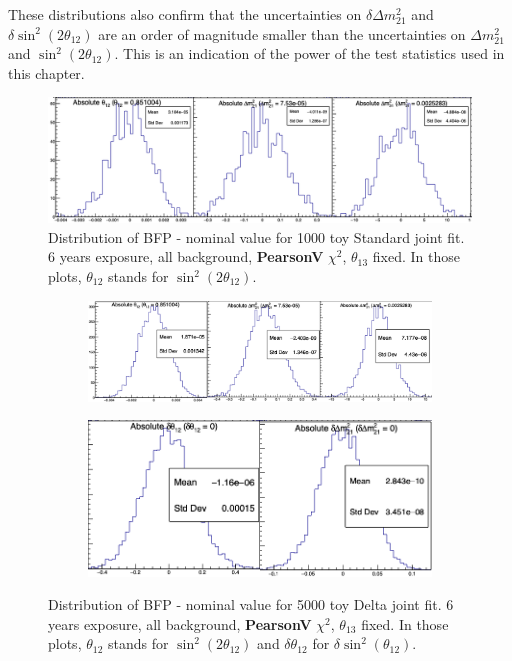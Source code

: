 \documentclass[../main.tex]{subfiles}
\begin{document}
These distributions also confirm that the uncertainties on $\delta \Delta m^2_{21}$ and $\delta \sin^2(2 \theta_{12})$ are an order of magnitude smaller than the uncertainties on $\Delta m^2_{21}$ and $\sin^2(2\theta_{12})$. This is an indication of the power of the test statistics used in this chapter.

\begin{figure}[ht]
  \centering
  \includegraphics[width=\linewidth]{images/joint_fit/absolute_standard_joint_pearsonV.png}
  \caption{Distribution of BFP - nominal value for 1000 toy Standard joint fit. 6 years exposure, all background, \textbf{PearsonV} $\chi^2$, $\theta_{13}$ fixed. In those plots, $\theta_{12}$ stands for $\sin^2(2\theta_{12})$.}
  \label{fig:joint_fit:abs_standard_pearsonV}
\end{figure}

\begin{figure}[ht]
  \centering
  \begin{subfigure}[t]{0.98\linewidth}
    \centering
    \includegraphics[width=\linewidth]{images/joint_fit/normal_delta_joint.png}
  \end{subfigure}

  \begin{subfigure}[t]{0.66\linewidth}
    \centering
    \includegraphics[width=\linewidth]{images/joint_fit/supp_delta_joint.png}
  \end{subfigure}

  \caption{Distribution of BFP - nominal value for 5000 toy Delta joint fit. 6 years exposure, all background, \textbf{PearsonV} $\chi^2$, $\theta_{13}$ fixed. In those plots, $\theta_{12}$ stands for $\sin^2(2\theta_{12})$ and $\delta \theta_{12}$ for $\delta \sin^2(\theta_{12})$.}
  \label{fig:joint_fit:delta_fit}
\end{figure}
\end{document}
